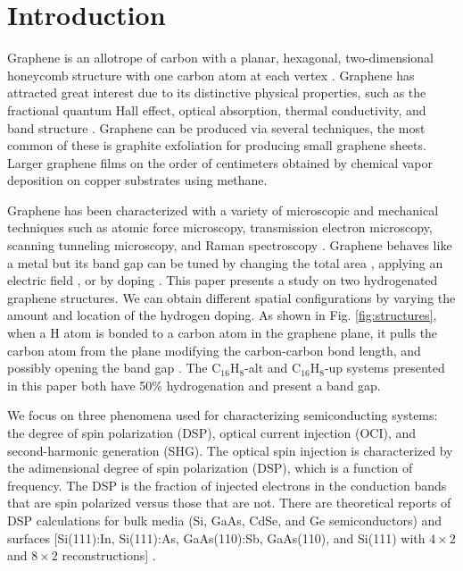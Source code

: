 \documentclass[pss]{wiley2sp} %
\begin{document}
\maketitle


\section{Introduction}\label{sec:intro}

Graphene is an allotrope of carbon with a planar, hexagonal, two-dimensional
honeycomb structure with one carbon atom at each vertex \cite{geim2007rise}.
Graphene has attracted great interest due to its distinctive physical
properties, such as the fractional quantum Hall effect, optical absorption,
thermal conductivity, and band structure \cite{geim2007rise,nair2008fine}.
Graphene can be produced via several techniques, the most common of these is
graphite exfoliation for producing small graphene sheets. Larger graphene
films on the order of centimeters obtained by chemical vapor deposition on
copper substrates using methane.

Graphene has been characterized with a variety of microscopic and mechanical
techniques such as atomic force microscopy, transmission electron microscopy,
scanning tunneling microscopy, and Raman spectroscopy
\cite{geim2007rise,rao2009graphene,boehm1994nomenclature,novoselov2005two}.
Graphene behaves like a metal \cite{geim2007rise} but its band gap can be
tuned by changing the total area \cite{han2007energy}, applying an electric
field \cite{zhang2009direct}, or by doping \cite{ohta2006controlling,%
elias2009control,guisinger2009exposure,samarakoon2010tunable}. This paper
presents a study on two hydrogenated graphene structures. We can obtain
different spatial configurations by varying the amount and location of the
hydrogen doping. As shown in Fig. \ref{fig:structures}, when a H atom is
bonded to a carbon atom in the graphene plane, it pulls the carbon atom from
the plane modifying the carbon-carbon bond length, and possibly opening the
band gap \cite{samarakoon2010tunable}. The C$_{16}$H$_{8}$-alt and
C$_{16}$H$_{8}$-up systems presented in this paper both have 50\%
hydrogenation and present a band gap.

We focus on three phenomena used for characterizing semiconducting systems:
the degree of spin polarization (DSP), optical current injection (OCI), and 
second-harmonic generation (SHG). The optical spin injection is characterized by 
the adimensional degree of spin polarization (DSP), which is a function of
frequency. The DSP is the fraction of injected electrons in the conduction
bands that are spin polarized versus those that are not. There are theoretical
reports of DSP calculations for bulk media (Si, GaAs, CdSe, and Ge
semiconductors) \cite{nastos2007full,cabellos2009stress,rioux2010optical} and
surfaces [Si(111):In, Si(111):As, GaAs(110):Sb, GaAs(110), and Si(111) with
$4\times2$ and $8\times2$ reconstructions]
\cite{mendoza2012optical,arzate2014optical}.
\end{document}
